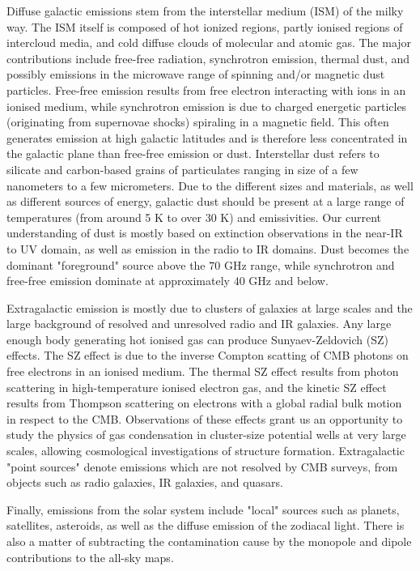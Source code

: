 \documentclass[12pt]{article}
\begin{document}
Diffuse galactic emissions stem from the interstellar medium (ISM) of the milky way. The ISM itself is composed of hot ionized regions, partly ionised regions of intercloud media, and cold diffuse clouds of molecular and atomic gas. The major contributions include free-free radiation, synchrotron emission, thermal dust, and possibly emissions in the microwave range of spinning and/or magnetic dust particles.
Free-free emission results from free electron interacting with ions in an ionised medium, while synchrotron emission is due to charged energetic particles (originating from supernovae shocks) spiraling in a magnetic field. This often generates emission at high galactic latitudes and is therefore less concentrated in the galactic plane than free-free emission or dust. Interstellar dust refers to silicate and carbon-based grains of particulates ranging in size of a few nanometers to a few micrometers. Due to the different sizes and materials, as well as different sources of energy, galactic dust should be present at a large range of temperatures (from around 5 K to over 30 K) and emissivities. Our current understanding of dust is mostly based on extinction observations in the near-IR to UV domain, as well as emission in the radio to IR domains. Dust becomes the dominant "foreground" source above the $70$ GHz range, while synchrotron and free-free emission dominate at approximately $40$ GHz and below.  

Extragalactic emission is mostly due to clusters of galaxies at large scales and the large background of resolved and unresolved radio and IR galaxies. Any large enough body generating hot ionised gas can produce Sunyaev-Zeldovich (SZ) effects. The SZ effect is due to the inverse Compton scatting of CMB photons on free electrons in an ionised medium. The thermal SZ effect results from photon scattering in high-temperature ionised electron gas, and the kinetic SZ effect results from Thompson scattering on electrons with a global radial bulk motion in respect to the CMB. Observations of these effects grant us an opportunity to study the physics of gas condensation in cluster-size potential wells at very large scales, allowing cosmological investigations of structure formation. Extragalactic "point sources" denote emissions which are not resolved by CMB surveys, from objects such as radio galaxies, IR galaxies, and quasars.

Finally, emissions from the solar system include "local" sources such as planets, satellites, asteroids, as well as the diffuse emission of the zodiacal light. There is also a matter of subtracting the contamination cause by the monopole and dipole contributions to the all-sky maps. \\
\end{document}

